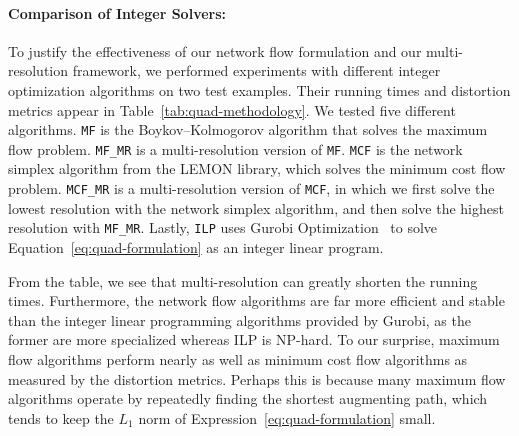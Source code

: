 \paragraph*{Comparison of Integer Solvers:} To justify the effectiveness of our network flow formulation and our multi-resolution framework, we performed experiments with different integer optimization algorithms on two test examples. Their running times and distortion metrics appear in Table~\ref{tab:quad-methodology}. We tested five different algorithms. \texttt{MF} is the Boykov--Kolmogorov algorithm that solves the maximum flow problem. \texttt{MF\_MR} is a multi-resolution version of \texttt{MF}. \texttt{MCF} is the network simplex algorithm from the LEMON library, which solves the minimum cost flow problem. \texttt{MCF\_MR} is a multi-resolution version of \texttt{MCF}, in which we first solve the lowest resolution with the network simplex algorithm, and then solve the highest resolution with \texttt{MF\_MR}. Lastly, \texttt{ILP} uses Gurobi Optimization~\cite{gurobi} to solve Equation~\eqref{eq:quad-formulation} as an integer linear program.

From the table, we see that multi-resolution can greatly shorten the running times. Furthermore, the network flow algorithms are far more efficient and stable than the integer linear programming algorithms provided by Gurobi, as the former are more specialized whereas ILP is NP-hard. To our surprise, maximum flow algorithms perform nearly as well as minimum cost flow algorithms as measured by the distortion metrics.  Perhaps this is because many maximum flow algorithms operate by repeatedly finding the shortest augmenting path, which tends to keep the $L_1$ norm of Expression~\eqref{eq:quad-formulation} small.

